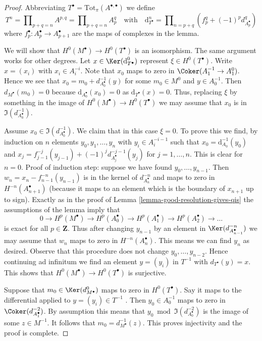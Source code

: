 \begin{proof}
Abbreviating $T^\bullet = \text{Tot}_\pi(A^{\bullet, \bullet})$
we define
$$
T^n = \prod\nolimits_{p + q = n} A^{p, q} =
\prod\nolimits_{p + q = n} A_p^q
\quad\text{with}\quad
\text{d}_{T^\bullet}^n =
\prod\nolimits_{n = p + q} (f_p^q + (-1)^pd_{A_p^\bullet}^q)
$$
where $f_p^\bullet : A_p^\bullet \to A_{p + 1}^\bullet$
are the maps of complexes in the lemma.

\medskip\noindent
We will show that $H^0(M^\bullet) \to H^0(T^\bullet)$ is an isomorphism.
The same argument works for other degrees.
Let $x \in \Ker(\text{d}_{T^\bullet}^0)$ represent $\xi \in H^0(T^\bullet)$.
Write $x = (x_i)$ with $x_i \in A_i^{-i}$.
Note that $x_0$ maps to zero in $\Coker(A_1^{-1} \to A_1^0)$.
Hence we see that $x_0 = m_0 + d_{A_0^\bullet}^{-1}(y)$ for some
$m_0 \in M^0$ and $y \in A_0^{-1}$.
Then $d_{M^\bullet}(m_0) = 0$ because $\text{d}_{A_0^\bullet}(x_0) = 0$
as $\text{d}_{T^\bullet}(x) = 0$.
Thus, replacing $\xi$ by something in the image of
$H^0(M^\bullet) \to H^0(T^\bullet)$ we may assume that $x_0$
is in $\Im(d^{-1}_{A_0^\bullet})$.

\medskip\noindent
Assume $x_0 \in \Im(d^{-1}_{A_0^\bullet})$. We claim that in this
case $\xi = 0$. To prove this we find, by induction on $n$ elements
$y_0, y_1, \ldots, y_n$ with $y_i \in A_i^{-i - 1}$ such that
$x_0 = \text{d}_{A_0}^{-1}(y_0)$ and
$x_j = f_{j - 1}^{-j}(y_{j - 1}) + (-1)^j d^{-j - 1}_{A_j^\bullet}(y_j)$
for $j = 1, \ldots, n$. This is clear for $n = 0$. Proof of induction step:
suppose we have found $y_0, \ldots, y_{n - 1}$. Then
$w_n = x_n - f_{n - 1}^{-n}(y_{n - 1})$ is in the kernel of
$d^{-n}_{A_n^\bullet}$ and maps to zero in $H^{-n}(A_{n + 1}^\bullet)$
(because it maps to an element which is the boundary
of $x_{n + 1}$ up to sign). Exactly as in the proof of
Lemma \ref{lemma-good-resolution-gives-qis}
the assumptions of the lemma imply that
$$
0 \to
H^p(M^\bullet) \to
H^p(A_0^\bullet) \to
H^p(A_1^\bullet) \to
H^p(A_2^\bullet) \to \ldots
$$
is exact for all $p \in \mathbf{Z}$. Thus after changing $y_{n - 1}$
by an element in $\Ker(d^{-n}_{A_{n - 1}^\bullet})$ we may assume
that $w_n$ maps to zero in $H^{-n}(A_n^\bullet)$. This means we
can find $y_n$ as desired. Observe that this procedure does not
change $y_0, \ldots, y_{n - 2}$. Hence continuing ad infinitum
we find an element $y = (y_i)$ in $T^{-1}$ with $d_{T^\bullet}(y) = x$.
This shows that $H^0(M^\bullet) \to H^0(T^\bullet)$ is surjective.

\medskip\noindent
Suppose that $m_0 \in \Ker(d^0_{M^\bullet})$ maps to zero in $H^0(T^\bullet)$.
Say it maps to the differential applied to $y = (y_i) \in T^{-1}$ .
Then $y_0 \in A_0^{-1}$ maps to zero in $\Coker(d^{-2}_{A_1^\bullet})$.
By assumption this means that $y_0 \bmod \Im(d^{-2}_{A_0^\bullet})$
is the image of some $z \in M^{-1}$. It follows that
$m_0 = d^{-1}_{M^\bullet}(z)$. This proves injectivity and the proof is
complete.
\end{proof}

